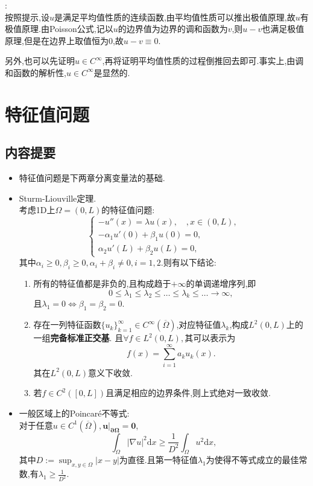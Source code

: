 \documentclass[12pt, a4paper]{ctexbook}
\newcommand{\dx}{\text{d}x}
\begin{document}
    \songti{}:\\
    
    按照提示,设$u$是满足平均值性质的连续函数,由平均值性质可以推出极值原理,故$u$有极值原理.由Poisson公式,记以$u$的边界值为边界的调和函数为$v$,则$u-v$也满足极值原理,但是在边界上取值恒为0,故$u-v\equiv 0$.
    
    另外,也可以先证明$u\in C^{\infty}$,再将证明平均值性质的过程倒推回去即可.事实上,由调和函数的解析性,$u\in C^{\infty}$是显然的.%
    
    \section{特征值问题}
    
    \subsection{内容提要}
    \begin{itemize}
        \item 特征值问题是下两章分离变量法的基础.
        \item Sturm-Liouville定理.\\
        \kaishu{}
        考虑1D上$\Omega=(0, L)$的特征值问题:
        $$\begin{cases}
        -u''(x) = \lambda u(x), \quad , x\in(0, L),\\
        -\alpha_1u'(0) + \beta_1u(0)=0,\\
        \alpha_2u'(L) + \beta_2u(L) = 0,
        \end{cases}$$
        其中$\alpha_i\geq0, \beta_i\geq0, \alpha_i + \beta_i \neq 0, i=1,2$.则有以下结论:
        \songti{}
        \begin{enumerate}
            \item 所有的特征值都是非负的,且构成趋于$+\infty$的单调递增序列,即
            $$0\leq \lambda_1\leq \lambda_2 \leq \dots\leq \lambda_k\leq\dots\rightarrow\infty,$$
            且$\lambda_1=0 \Leftrightarrow \beta_1=\beta_2=0$.
            \item 存在一列特征函数$\{u_k\}_{k=1}^\infty\in C^\infty(\overline{\Omega})$,对应特征值$\lambda_k$,构成$L^2(0, L)$上的一组{\bf 完备标准正交基}. 且$\forall f\in L^2(0, L),$其可以表示为
            $$f(x) = \sum_{i=1}^\infty a_ku_k(x).$$其在$L^2(0, L)$意义下收敛.
            \item 若$f\in C^2([0, L])$且满足相应的边界条件,则上式绝对一致收敛.
        \end{enumerate}
        \item 一般区域上的Poincar\'{e}不等式:\\
        对于任意$u\in C^1(\overline{\Omega}), \bm{u|_{\partial\Omega}=0}$,
        $$ \int_\Omega |\nabla u|^2 \dx \geq \frac1{D^2}\int_\Omega u^2 \dx,$$
        其中$D := \sup_{x,y\in\Omega}|x-y|$为直径.且第一特征值$\lambda_1$为使得不等式成立的最佳常数,有$\lambda_1 \geq \frac1{D^2}$.
    \end{itemize}
    
\end{document}

